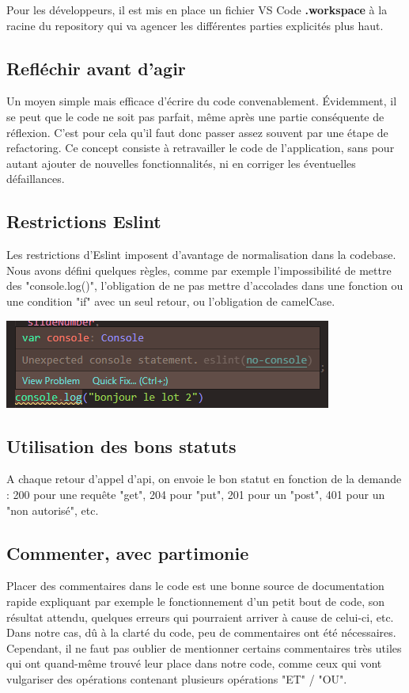  
Pour les développeurs, il est mis en place un fichier VS Code \textbf{.workspace} à la racine du repository qui va agencer les différentes parties explicités plus haut.

\subsection{Refléchir avant d'agir}

Un moyen simple mais efficace d'écrire du code convenablement. Évidemment, il se peut que le code ne soit pas parfait, même après une partie conséquente de réflexion. C'est pour cela qu'il faut donc passer assez souvent par une étape de refactoring. Ce concept consiste à retravailler le code de l'application, sans pour autant ajouter de nouvelles fonctionnalités, ni en corriger les éventuelles défaillances.

\subsection{Restrictions Eslint}
\label{ESlint}

Les restrictions d'Eslint imposent d'avantage de normalisation dans la codebase. Nous avons défini quelques règles, comme par exemple l'impossibilité de mettre des "console.log()", l'obligation de ne pas mettre d'accolades dans une fonction ou une condition "if" avec un seul retour, ou l'obligation de camelCase. 

\label{Exemple d'un schéma de validation (Drivers)}
\begin{center}
\includegraphics[scale=0.8]{medias/console.png}
\end{center}

\subsection{Utilisation des bons statuts}

A chaque retour d'appel d'api, on envoie le bon statut en fonction de la demande : 200 pour une requête "get", 204 pour "put", 201 pour un "post", 401 pour un "non autorisé", etc. 

\subsection{Commenter, avec partimonie}

Placer des commentaires dans le code est une bonne source de documentation rapide expliquant par exemple le fonctionnement d'un petit bout de code, son résultat attendu, quelques erreurs qui pourraient arriver à cause de celui-ci, etc. Dans notre cas, dû à la clarté du code, peu de commentaires ont été nécessaires. Cependant, il ne faut pas oublier de mentionner certains commentaires très utiles qui ont quand-même trouvé leur place dans notre code, comme ceux qui vont vulgariser des opérations contenant plusieurs opérations "ET" / "OU".


